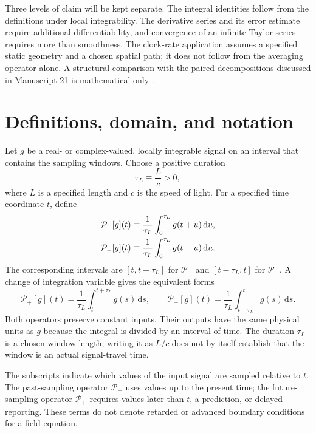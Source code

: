 \documentclass[12pt]{article}
\begin{document}
Three levels of claim will be kept separate. The integral identities follow from the definitions under local integrability. The derivative series and its error estimate require additional differentiability, and convergence of an infinite Taylor series requires more than smoothness. The clock-rate application assumes a specified static geometry and a chosen spatial path; it does not follow from the averaging operator alone. A structural comparison with the paired decompositions discussed in Manuscript 21 is mathematical only \cite{LMP21}.

\section{Definitions, domain, and notation}

Let $g$ be a real- or complex-valued, locally integrable signal on an interval that contains the sampling windows. Choose a positive duration
\begin{equation}
  \tau_L\equiv\frac{L}{c}>0,
  \label{eq:tau-L}
\end{equation}
where $L$ is a specified length and $c$ is the speed of light. For a specified time coordinate $t$, define
\begin{align}
  \mathcal{P}_{+}[g](t)
  &\equiv\frac{1}{\tau_L}\int_0^{\tau_L}g(t+u)\,\mathrm{d}u,
  \label{eq:window-definitions}\\
  \mathcal{P}_{-}[g](t)
  &\equiv\frac{1}{\tau_L}\int_0^{\tau_L}g(t-u)\,\mathrm{d}u.\notag
\end{align}
The corresponding intervals are $[t,t+\tau_L]$ for $\mathcal{P}_{+}$ and $[t-\tau_L,t]$ for $\mathcal{P}_{-}$. A change of integration variable gives the equivalent forms
\begin{equation}
  \mathcal{P}_{+}[g](t)
  =\frac{1}{\tau_L}\int_t^{t+\tau_L}g(s)\,\mathrm{d}s,
  \qquad
  \mathcal{P}_{-}[g](t)
  =\frac{1}{\tau_L}\int_{t-\tau_L}^{t}g(s)\,\mathrm{d}s.
  \label{eq:shifted-integrals}
\end{equation}
Both operators preserve constant inputs. Their outputs have the same physical units as $g$ because the integral is divided by an interval of time. The duration $\tau_L$ is a chosen window length; writing it as $L/c$ does not by itself establish that the window is an actual signal-travel time.

The subscripts indicate which values of the input signal are sampled relative to $t$. The past-sampling operator $\mathcal{P}_{-}$ uses values up to the present time; the future-sampling operator $\mathcal{P}_{+}$ requires values later than $t$, a prediction, or delayed reporting. These terms do not denote retarded or advanced boundary conditions for a field equation.
\end{document}
